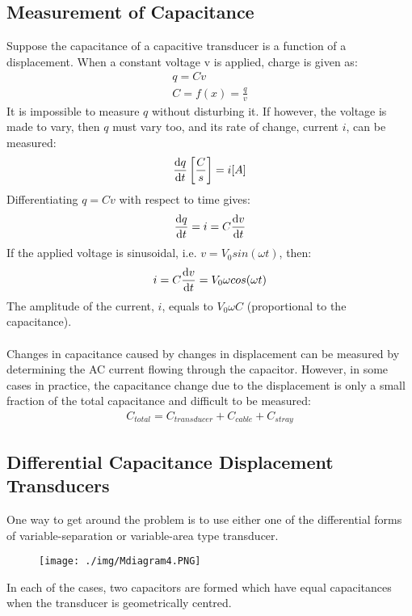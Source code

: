 \subsection{Measurement of Capacitance}
Suppose the capacitance of a capacitive transducer is a function of a displacement. When a constant voltage v is applied, charge is given as:
\begin{gather}
  q = Cv \\
  C = f(x) = \frac{q}{v}
\end{gather}
It is impossible to measure $q$ without disturbing it. If however, the voltage is made to vary, then $q$ must vary too, and its rate of change, current $i$, can be measured:
\begin{gather}
  \frac{\dif q}{\dif t}\left[\frac{C}{s}\right] = i[A]
\end{gather}
Differentiating $q = Cv$ with respect to time gives:
\begin{gather}
  \frac{\dif q}{\dif t} = i = C\frac{\dif v}{\dif t}
\end{gather}
If the applied voltage is sinusoidal, i.e. $v = V_0sin(\omega t)$, then:
\begin{gather}
  i = C\frac{\dif v}{\dif t} = V_0\omega cos(\omega t)
\end{gather}
The amplitude of the current, $i$, equals to $V_0\omega C$ (proportional to the capacitance). \\\\
Changes in capacitance caused by changes in displacement can be measured by determining the AC current flowing through the capacitor. However, in some cases in practice, the capacitance change due to the displacement is only a small fraction of the total capacitance and difficult to be measured:
\begin{gather}
  C_{total} = C_{transducer}+C_{cable}+C_{stray}
\end{gather}
\subsection{Differential Capacitance Displacement Transducers}
One way to get around the problem is to use either one of the differential forms of variable-separation or variable-area type transducer.
\begin{figure}[H]
  \centering
  \texttt{[image: ./img/Mdiagram4.PNG]}
\end{figure}
In each of the cases, two capacitors are formed which have equal capacitances when the transducer is geometrically centred.
